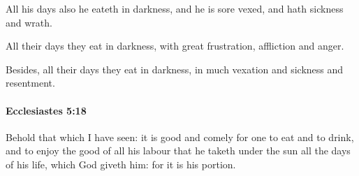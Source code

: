 			\begin{versebox}
					\item[BHS] 
					\item[LXX] 
					\item[ASV] All his days also he eateth in darkness, and he is sore vexed, and hath sickness and wrath.
					\item[NIV] All their days they eat in darkness, with great frustration, affliction and anger.
					\item[NRSV] Besides, all their days they eat in darkness, in much vexation and sickness and resentment.
			\end{versebox}

		\paragraph{Ecclesiastes 5:18} %
			\label{ECCLESIASTES-5-18}

			Behold that which I have seen: it is good and comely for one to eat and to drink, and to enjoy the good of all his labour that he taketh under the sun all the days of his life, which God giveth him: for it is his portion.

